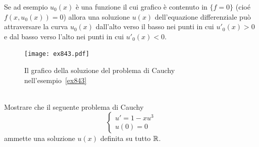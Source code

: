 Se ad esempio $u_0(x)$ è una funzione
il cui grafico è contenuto in $\{f=0\}$
(cioé $f(x,u_0(x))=0$) allora una soluzione $u(x)$ dell'equazione
differenziale può attraversare la curva $u_0(x)$ dall'alto verso il
basso nei punti in cui $u'_0(x)>0$ e dal basso verso l'alto nei punti
in cui $u'_0(x)<0$.

\newsavebox{\qrexoqt}
\begin{figure}
\centering
\texttt{[image: ex843.pdf]}
\caption{Il grafico della soluzione del problema di Cauchy nell'esempio~\ref{ex843}
\ifwidemargin\\\\\fi%
\usebox{\qrexoqt}}
\label{fig:ex843}
\end{figure}
%
\begin{example}\label{ex843}
Mostrare che il seguente problema di Cauchy
\[
\begin{cases}
  u'=1-x u^3\\
  u(0)=0
\end{cases}
\]
ammette una soluzione $u(x)$ definita su tutto ${\mathbb R}$.
\end{example}
%
